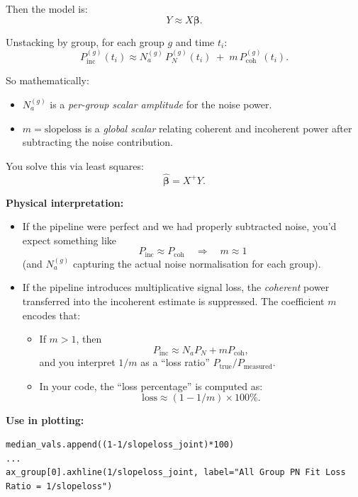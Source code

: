 \documentclass[11pt]{article}
\begin{document}
Then the model is:
\[
  Y \approx X \boldsymbol{\beta}.
\]

Unstacking by group, for each group $g$ and time $t_i$:
\[
  P_{\mathrm{inc}}^{(g)}(t_i) \approx
  N_a^{(g)}\, P_{N}^{(g)}(t_i) \;+\; m\, P_{\mathrm{coh}}^{(g)}(t_i).
\]

So mathematically:

\begin{itemize}[leftmargin=*]
  \item $N_a^{(g)}$ is a \emph{per-group scalar amplitude} for the noise power.
  \item $m = \text{slopeloss}$ is a \emph{global scalar} relating coherent and incoherent power after subtracting the noise contribution.
\end{itemize}

You solve this via least squares:
\[
  \hat{\boldsymbol{\beta}} = X^+ Y.
\]

\textbf{Physical interpretation:}

\begin{itemize}[leftmargin=*]
  \item If the pipeline were perfect and we had properly subtracted noise, you’d expect something like
  \[
    P_{\mathrm{inc}} \approx P_{\mathrm{coh}}
    \quad \Rightarrow \quad m \approx 1
  \]
  (and $N_a^{(g)}$ capturing the actual noise normalisation for each group).

  \item If the pipeline introduces multiplicative signal loss, the \emph{coherent} power transferred into the incoherent estimate is suppressed. The coefficient $m$ encodes that:
  \begin{itemize}[leftmargin=*]
    \item If $m > 1$, then
      \[
        P_{\mathrm{inc}} \approx N_a P_N + m P_{\mathrm{coh}},
      \]
      and you interpret $1/m$ as a ``loss ratio'' $P_{\text{true}} / P_{\text{measured}}$.
    \item In your code, the ``loss percentage'' is computed as:
      \[
        \text{loss} \approx (1 - 1/m)\times 100\%.
      \]
  \end{itemize}
\end{itemize}

\textbf{Use in plotting:}

\begin{verbatim}
median_vals.append((1-1/slopeloss_joint)*100)
...
ax_group[0].axhline(1/slopeloss_joint, label="All Group PN Fit Loss Ratio = 1/slopeloss")
\end{verbatim}
\end{document}
